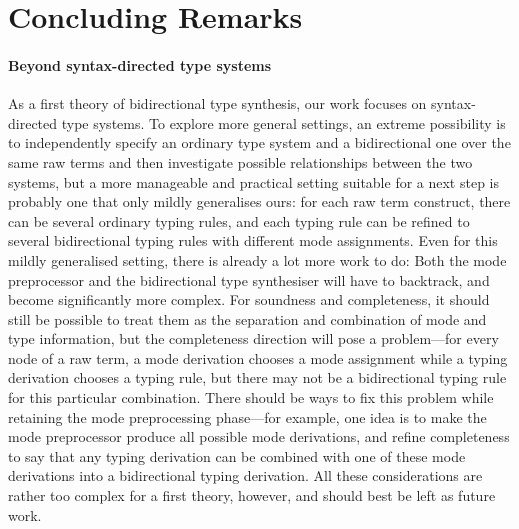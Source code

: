 
\section{Concluding Remarks} \label{sec:future}

\paragraph{Beyond syntax-directed type systems}

As a first theory of bidirectional type synthesis, our work focuses on syntax-directed type systems.
To explore more general settings, an extreme possibility is to independently specify an ordinary type system and a bidirectional one over the same raw terms and then investigate possible relationships between the two systems, but a more manageable and practical setting suitable for a next step is probably one that only mildly generalises ours: 
for each raw term construct, there can be several ordinary typing rules, and each typing rule can be refined to several bidirectional typing rules with different mode assignments.
Even for this mildly generalised setting, there is already a lot more work to do:
Both the mode preprocessor and the bidirectional type synthesiser will have to backtrack, and become significantly more complex.
For soundness and completeness, it should still be possible to treat them as the separation and combination of mode and type information, but the completeness direction will pose a problem---for every node of a raw term, a mode derivation chooses a mode assignment while a typing derivation chooses a typing rule, but there may not be a bidirectional typing rule for this particular combination.
There should be ways to fix this problem while retaining the mode preprocessing phase---for example, one idea is to make the mode preprocessor produce all possible mode derivations, and refine completeness to say that any typing derivation can be combined with one of these mode derivations into a bidirectional typing derivation.
All these considerations are rather too complex for a first theory, however, and should best be left as future work.


